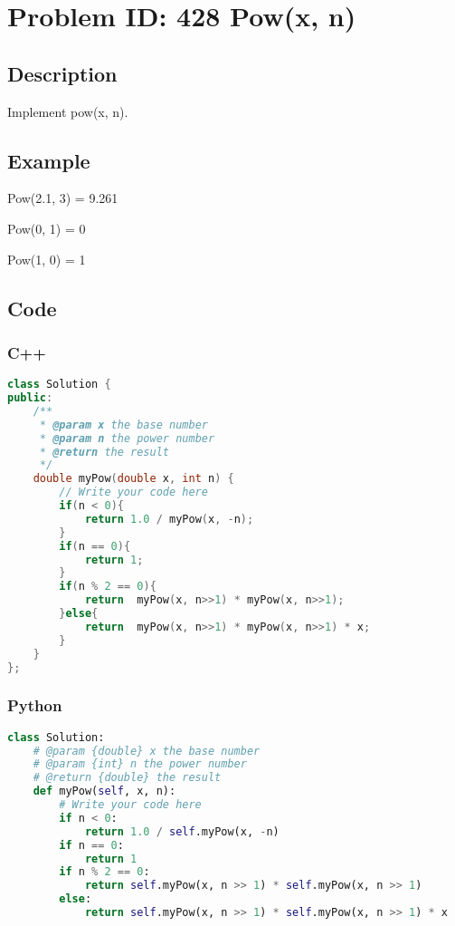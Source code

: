 \section{Problem ID: 428 Pow(x, n)}
\subsection{Description}
Implement pow(x, n).

\subsection{Example}
Pow(2.1, 3) = 9.261

Pow(0, 1) = 0

Pow(1, 0) = 1

\subsection{Code}
\scriptsize
\subsubsection{C++}
\begin{lstlisting}[language=C++]
class Solution {
public:
    /**
     * @param x the base number
     * @param n the power number
     * @return the result
     */
    double myPow(double x, int n) {
        // Write your code here
        if(n < 0){
            return 1.0 / myPow(x, -n);
        }
        if(n == 0){
            return 1;
        }
        if(n % 2 == 0){
            return  myPow(x, n>>1) * myPow(x, n>>1);
        }else{
            return  myPow(x, n>>1) * myPow(x, n>>1) * x;
        }
    }
};
\end{lstlisting}

\subsubsection{Python}
\begin{lstlisting}[language=Python]
class Solution:
    # @param {double} x the base number
    # @param {int} n the power number
    # @return {double} the result
    def myPow(self, x, n):
        # Write your code here
        if n < 0:
            return 1.0 / self.myPow(x, -n)
        if n == 0:
            return 1
        if n % 2 == 0:
            return self.myPow(x, n >> 1) * self.myPow(x, n >> 1)
        else:
            return self.myPow(x, n >> 1) * self.myPow(x, n >> 1) * x
\end{lstlisting}
\normalsize 